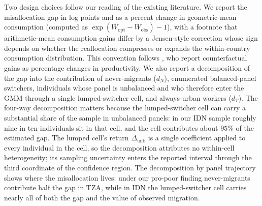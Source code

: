 Two design choices follow our reading of the existing literature.
We report the misallocation gap in log points and as a percent change in geometric-mean consumption (computed as $\exp(W_{\text{opt}} - W_{\text{obs}}) - 1$), with a footnote that arithmetic-mean consumption gains differ by a Jensen-style correction whose sign depends on whether the reallocation compresses or expands the within-country consumption distribution.
This convention follows \cite{bryanAggregateProductivityEffects2019}, who report counterfactual gains as percentage changes in productivity.
We also report a decomposition of the gap into the contribution of never-migrants ($d_N$), enumerated balanced-panel switchers, individuals whose panel is unbalanced and who therefore enter the GMM through a single lumped-switcher cell, and always-urban workers ($d_T$).
The four-way decomposition matters because the lumped-switcher cell can carry a substantial share of the sample in unbalanced panels: in our IDN sample roughly nine in ten individuals sit in that cell, and the cell contributes about $95\%$ of the estimated gap.
The lumped cell's return $\Delta_{\text{unb}}$ is a single coefficient applied to every individual in the cell, so the decomposition attributes no within-cell heterogeneity; its sampling uncertainty enters the reported interval through the third coordinate of the confidence region.
The decomposition by panel trajectory shows where the misallocation lives: under our pro-poor finding never-migrants contribute half the gap in TZA, while in IDN the lumped-switcher cell carries nearly all of both the gap and the value of observed migration.

